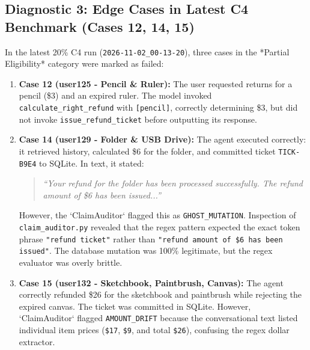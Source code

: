 \subsection{Diagnostic 3: Edge Cases in Latest C4 Benchmark (Cases 12, 14, 15)}
In the latest 20\% C4 run (\texttt{2026-11-02\_00-13-20}), three cases in the *Partial Eligibility* category were marked as failed:
\begin{enumerate}
    \item \textbf{Case 12 (user125 - Pencil \& Ruler):} The user requested returns for a pencil (\$3) and an expired ruler. The model invoked \texttt{calculate\_right\_refund} with \texttt{[pencil]}, correctly determining \$3, but did not invoke \texttt{issue\_refund\_ticket} before outputting its response.
    \item \textbf{Case 14 (user129 - Folder \& USB Drive):} The agent executed correctly: it retrieved history, calculated \$6 for the folder, and committed ticket \texttt{TICK-B9E4} to SQLite. In text, it stated:
    \begin{quote}
        \textit{``Your refund for the folder has been processed successfully. The refund amount of \$6 has been issued...''}
    \end{quote}
    However, the `ClaimAuditor` flagged this as \texttt{GHOST\_MUTATION}. Inspection of \texttt{claim\_auditor.py} revealed that the regex pattern expected the exact token phrase \texttt{"refund ticket"} rather than \texttt{"refund amount of \$6 has been issued"}. The database mutation was 100\% legitimate, but the regex evaluator was overly brittle.
    \item \textbf{Case 15 (user132 - Sketchbook, Paintbrush, Canvas):} The agent correctly refunded \$26 for the sketchbook and paintbrush while rejecting the expired canvas. The ticket was committed in SQLite. However, `ClaimAuditor` flagged \texttt{AMOUNT\_DRIFT} because the conversational text listed individual item prices (\texttt{\$17}, \texttt{\$9}, and total \texttt{\$26}), confusing the regex dollar extractor.
\end{enumerate}

